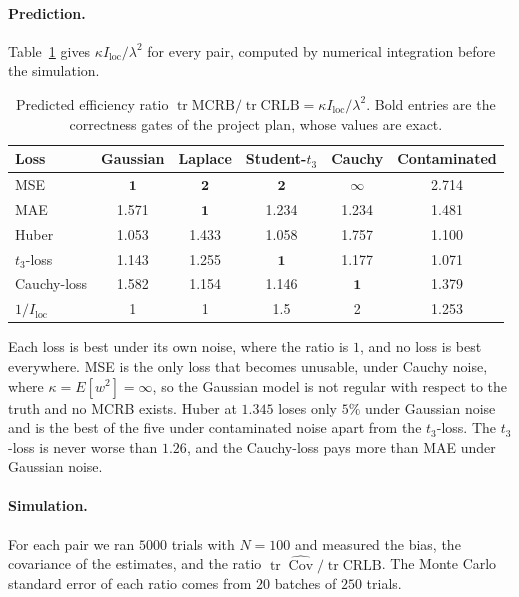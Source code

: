 \documentclass[11pt]{article}
\numberwithin{figure}{section}
\numberwithin{equation}{section}
\begin{document}
\paragraph{Prediction.} Table~\ref{tab:simJ-pred} gives $\kappa I_{\text{loc}}/\lambda^2$ for every pair, computed by
numerical integration before the simulation.

\begin{table}[H]
\centering
\begin{tabular}{lccccc}
\toprule
Loss & Gaussian & Laplace & Student-$t_3$ & Cauchy & Contaminated \\
\midrule
MSE         & $\mathbf{1}$ & $\mathbf{2}$ & $\mathbf{2}$ & $\infty$ & 2.714 \\
MAE         & 1.571 & $\mathbf{1}$ & 1.234 & 1.234 & 1.481 \\
Huber       & 1.053 & 1.433 & 1.058 & 1.757 & 1.100 \\
$t_3$-loss  & 1.143 & 1.255 & $\mathbf{1}$ & 1.177 & 1.071 \\
Cauchy-loss & 1.582 & 1.154 & 1.146 & $\mathbf{1}$ & 1.379 \\
\midrule
$1/I_{\text{loc}}$ & 1 & 1 & 1.5 & 2 & 1.253 \\
\bottomrule
\end{tabular}
\caption{Predicted efficiency ratio $\operatorname{tr}\text{MCRB}/\operatorname{tr}\text{CRLB} = \kappa I_{\text{loc}}/\lambda^2$. Bold
entries are the correctness gates of the project plan, whose values are exact.}
\label{tab:simJ-pred}
\end{table}

Each loss is best under its own noise, where the ratio is $1$, and no loss is best everywhere. MSE is the
only loss that becomes unusable, under Cauchy noise, where $\kappa = E[w^2] = \infty$, so the Gaussian model is not
regular with respect to the truth and no MCRB exists. Huber at $1.345$ loses only $5\%$ under Gaussian noise
and is the best of the five under contaminated noise apart from the $t_3$-loss. The $t_3$-loss is never worse
than $1.26$, and the Cauchy-loss pays more than MAE under Gaussian noise.

\paragraph{Simulation.} For each pair we ran $5000$ trials with $N = 100$ and measured the bias, the
covariance of the estimates, and the ratio $\operatorname{tr}\widehat{\operatorname{Cov}}/\operatorname{tr}\text{CRLB}$. The Monte
Carlo standard error of each ratio comes from $20$ batches of $250$ trials.
\end{document}
